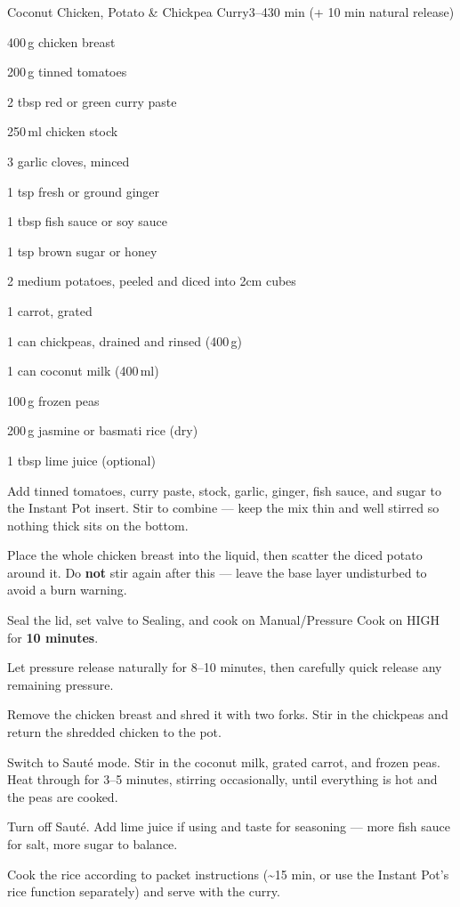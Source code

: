 \begin{recipebox}{Coconut Chicken, Potato \& Chickpea Curry}{3--4}{30 min (+ 10 min natural release)}

\begin{ingredients}
  \item 400\,g chicken breast
  \item 200\,g tinned tomatoes
  \item 2 tbsp red or green curry paste
  \item 250\,ml chicken stock
  \item 3 garlic cloves, minced
  \item 1 tsp fresh or ground ginger
  \item 1 tbsp fish sauce or soy sauce
  \item 1 tsp brown sugar or honey
  \item 2 medium potatoes, peeled and diced into 2cm cubes
  \item 1 carrot, grated
  \item 1 can chickpeas, drained and rinsed (400\,g)
  \item 1 can coconut milk (400\,ml)
  \item 100\,g frozen peas
  \item 200\,g jasmine or basmati rice (dry)
  \item 1 tbsp lime juice (optional)
\end{ingredients}

\begin{method}
  \item Add tinned tomatoes, curry paste, stock, garlic, ginger, fish sauce, and sugar to the Instant Pot insert. Stir to combine --- keep the mix thin and well stirred so nothing thick sits on the bottom.
  \item Place the whole chicken breast into the liquid, then scatter the diced potato around it. Do \textbf{not} stir again after this --- leave the base layer undisturbed to avoid a burn warning.
  \item Seal the lid, set valve to Sealing, and cook on Manual/Pressure Cook on HIGH for \textbf{10 minutes}.
  \item Let pressure release naturally for 8--10 minutes, then carefully quick release any remaining pressure.
  \item Remove the chicken breast and shred it with two forks. Stir in the chickpeas and return the shredded chicken to the pot.
  \item Switch to Saut\'{e} mode. Stir in the coconut milk, grated carrot, and frozen peas. Heat through for 3--5 minutes, stirring occasionally, until everything is hot and the peas are cooked.
  \item Turn off Saut\'{e}. Add lime juice if using and taste for seasoning --- more fish sauce for salt, more sugar to balance.
  \item Cook the rice according to packet instructions (\textasciitilde15 min, or use the Instant Pot's rice function separately) and serve with the curry.
\end{method}


\end{recipebox}
